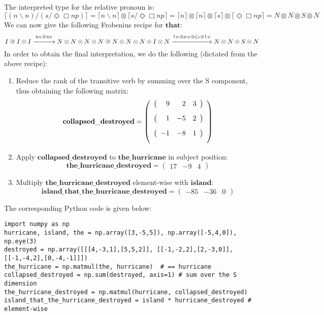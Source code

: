 \documentclass[]{article}
\newcommand{\Wv}[1]{\mathbf{#1}}
\newcommand{\bs}{\backslash}
\newcommand{\F}[1]{\lceil #1 \rceil}
\begin{document}
\subsection{}
The interpreted type for the relative pronoun is:
\[ \F{(n\bs n)/(s/\Diamond\Box np)} = \F{n\bs n} \otimes \F{s/\Diamond\Box np} = 
\F{n} \otimes \F{n} \otimes \F{s} \otimes \F{\Diamond\Box np} =
N \otimes N \otimes S \otimes N \]
We can now give the following Frobenius recipe for $\Wv{that}$:
\[ I \cong I \otimes I \overset{\eta_N \otimes \eta_N}{\xrightarrow{\hspace*{1cm}}} N \otimes N \otimes N \otimes N \cong N \otimes N \otimes N \otimes I \otimes N \overset{1_N \otimes \mu_N \otimes \zeta_S \otimes 1_N}{\xrightarrow{\hspace*{2cm}}} N \otimes N \otimes S \otimes N \] 
In order to obtain the final interpretation, we do the following (dictated from the above recipe):
\begin{enumerate}
\item Reduce the rank of the transitive verb by summing over the S component, thus obtaining the following matrix:
\[
\Wv{collapsed\_destroyed} =
\left(\begin{array}{ccc}
\left(\begin{array}{rrr}\textcolor{white}{-}9 & \textcolor{white}{-}2 & 3 \end{array}\right)\\[2ex]
\left(\begin{array}{rrr}\textcolor{white}{-}1 & -5 & 2 \end{array}\right)\\[2ex]
\left(\begin{array}{rrr}-1 & -8 & 1 \end{array}\right)\\[2ex]
\end{array}
\right)
\]
\item Apply $\Wv{collapsed\_destroyed}$ to $\Wv{the\_hurricane}$ in subject position:
\[
\Wv{the\_hurricane\_destroyed} =
\left(\begin{array}{ccc} 17 & -9 & 4 \end{array}\right)
\]
\item Multiply $\Wv{the\_hurricane\_destroyed}$ element-wise with $\Wv{island}$:
\[
\Wv{island\_that\_the\_hurricane\_destroyed} =
\left(\begin{array}{ccc} -85 & -36 & 0 \end{array}\right)
\]
\end{enumerate}
The corresponding Python code is given below:
\begin{verbatim}
import numpy as np
hurricane, island, the = np.array([3,-5,5]), np.array([-5,4,0]), np.eye(3)
destroyed = np.array([[[4,-3,1],[5,5,2]], [[-1,-2,2],[2,-3,0]], [[-1,-4,2],[0,-4,-1]]])
the_hurricane = np.matmul(the, hurricane)  # == hurricane
collapsed_destroyed = np.sum(destroyed, axis=1) # sum over the S dimension
the_hurricane_destroyed = np.matmul(hurricane, collapsed_destroyed)
island_that_the_hurricane_destroyed = island * hurricane_destroyed # element-wise
\end{verbatim}
\end{document}

